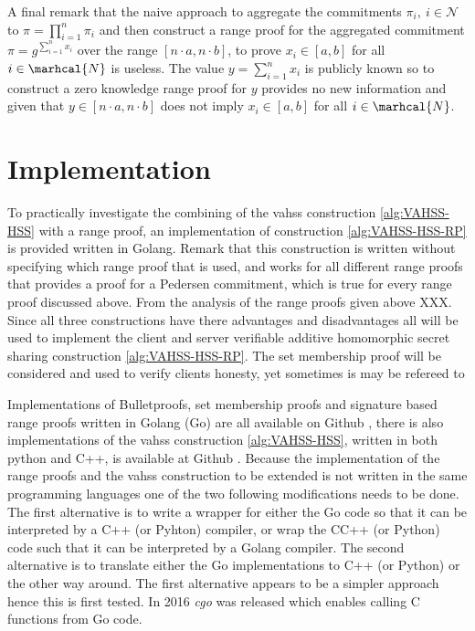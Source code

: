 A final remark that the naive approach to aggregate the commitments $\pi_i, \: i\in\mathcal{N}$ to $\pi = \prod_{i=1}^n \pi_i$ and then construct a range proof for the aggregated commitment $\pi = g^{\sum_{i=1}^n x_i}$ over the range $[n\cdot a,n\cdot b]$, to prove $x_i\in [a,b]$ for all $i\in\marhcal{N}$  is useless. The value $y=\sum_{i=1}^n x_i$ is publicly known so to construct a zero knowledge range proof for $y $ provides no new information and given that $y\in [n\cdot a,n\cdot b]$ does not imply $x_i\in [a,b]$ for all $i\in\marhcal{N}$. 

\section{Implementation}
To practically investigate the combining of the vahss construction \ref{alg:VAHSS-HSS} with a range proof, an implementation of construction \ref{alg:VAHSS-HSS-RP} is provided written in Golang. Remark that this construction is written without specifying which range proof that is used, and works for all different range proofs that provides a proof for a Pedersen commitment, which is true for every range proof discussed above. From the analysis of the range proofs given above XXX. Since all three constructions have there advantages and disadvantages all will be used to implement the client and server verifiable additive homomorphic secret sharing construction \ref{alg:VAHSS-HSS-RP}. The set membership proof will be considered and used to verify clients honesty, yet sometimes is may be refereed to 

Implementations of Bulletproofs, set membership proofs and signature based range proofs written in Golang (Go) are all available on Github \cite{Git:RP}, there is also   implementations of the vahss construction \ref{alg:VAHSS-HSS}, written in both python and C++, is available at Github \cite{Git:python_vahss} \cite{Git:C_vahss}.
Because the implementation of the range proofs and the vahss construction to be extended is not written in the same programming languages one of the two following modifications needs to be done. The first alternative is to write a wrapper for either the Go code so that it can be interpreted by a C++ (or Pyhton) compiler, or wrap the CC++ (or Python) code such that it can be interpreted by a Golang compiler. The second alternative is to translate either the Go implementations to C++ (or Python) or the other way around. The first alternative appears to be a simpler approach hence this is first tested. In 2016 \textit{cgo} was released which enables calling C functions from Go code. 

